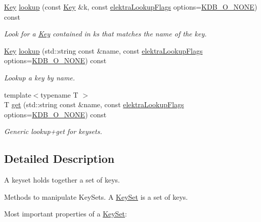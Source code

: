 \begin{DoxyCompactItemize}
\hyperlink{classkdb_1_1Key}{Key} \hyperlink{classkdb_1_1KeySet_a2b8537e388edfbb6941d771106c0ae3a}{lookup} (const \hyperlink{classkdb_1_1Key}{Key} \&k, const \hyperlink{group__keyset_gada05f4bbf46fde81d0d57df86e73d914}{elektra\+Lookup\+Flags} options=\hyperlink{group__keyset_ggada05f4bbf46fde81d0d57df86e73d914a00738455e0ae843c8720809d8287f370}{K\+D\+B\+\_\+\+O\+\_\+\+N\+O\+NE}) const
\begin{DoxyCompactList}\small\item\em Look for a \hyperlink{classkdb_1_1Key}{Key} contained in {\ttfamily ks} that matches the name of the {\ttfamily key}. \end{DoxyCompactList}\item 
\hyperlink{classkdb_1_1Key}{Key} \hyperlink{classkdb_1_1KeySet_a0ef071747608900be478219e4a040612}{lookup} (std\+::string const \&name, const \hyperlink{group__keyset_gada05f4bbf46fde81d0d57df86e73d914}{elektra\+Lookup\+Flags} options=\hyperlink{group__keyset_ggada05f4bbf46fde81d0d57df86e73d914a00738455e0ae843c8720809d8287f370}{K\+D\+B\+\_\+\+O\+\_\+\+N\+O\+NE}) const
\begin{DoxyCompactList}\small\item\em Lookup a key by name. \end{DoxyCompactList}\item 
{\footnotesize template$<$typename T $>$ }\\T \hyperlink{classkdb_1_1KeySet_a65208974b44da0162ef70dd7a173748f}{get} (std\+::string const \&name, const \hyperlink{group__keyset_gada05f4bbf46fde81d0d57df86e73d914}{elektra\+Lookup\+Flags} options=\hyperlink{group__keyset_ggada05f4bbf46fde81d0d57df86e73d914a00738455e0ae843c8720809d8287f370}{K\+D\+B\+\_\+\+O\+\_\+\+N\+O\+NE}) const
\begin{DoxyCompactList}\small\item\em Generic lookup+get for keysets. \end{DoxyCompactList}\end{DoxyCompactItemize}


\subsection{Detailed Description}
A keyset holds together a set of keys. 

Methods to manipulate Key\+Sets. A \hyperlink{classkdb_1_1KeySet}{Key\+Set} is a set of keys.

Most important properties of a \hyperlink{classkdb_1_1KeySet}{Key\+Set}\+:


